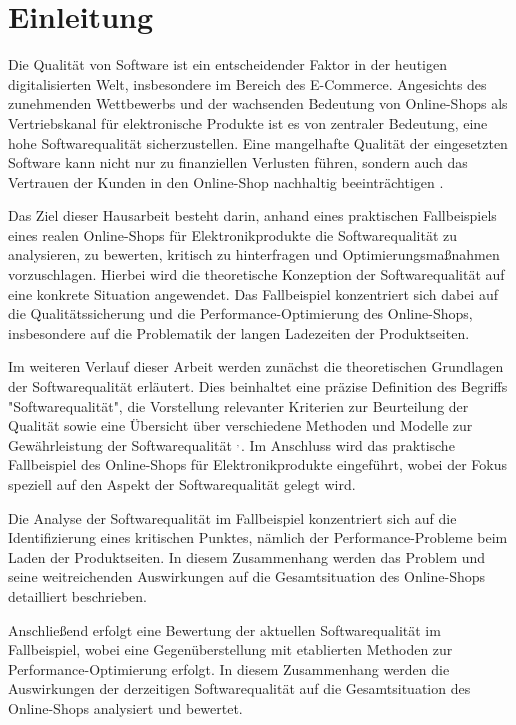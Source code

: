 \section{Einleitung}
Die Qualität von Software ist ein entscheidender Faktor in der heutigen digitalisierten Welt, insbesondere im Bereich des E-Commerce. Angesichts des zunehmenden Wettbewerbs und der wachsenden Bedeutung von Online-Shops als Vertriebskanal für elektronische Produkte ist es von zentraler Bedeutung, eine hohe Softwarequalität sicherzustellen. Eine mangelhafte Qualität der eingesetzten Software kann nicht nur zu finanziellen Verlusten führen, sondern auch das Vertrauen der Kunden in den Online-Shop nachhaltig beeinträchtigen .

Das Ziel dieser Hausarbeit besteht darin, anhand eines praktischen Fallbeispiels eines realen Online-Shops für Elektronikprodukte die Softwarequalität zu analysieren, zu bewerten, kritisch zu hinterfragen und Optimierungsmaßnahmen vorzuschlagen. Hierbei wird die theoretische Konzeption der Softwarequalität auf eine konkrete Situation angewendet. Das Fallbeispiel konzentriert sich dabei auf die Qualitätssicherung und die Performance-Optimierung des Online-Shops, insbesondere auf die Problematik der langen Ladezeiten der Produktseiten.

Im weiteren Verlauf dieser Arbeit werden zunächst die theoretischen Grundlagen der Softwarequalität erläutert. Dies beinhaltet eine präzise Definition des Begriffs "Softwarequalität", die Vorstellung relevanter Kriterien zur Beurteilung der Qualität sowie eine Übersicht über verschiedene Methoden und Modelle zur Gewährleistung der Softwarequalität 
$^{,\hspace{1pt}}$. Im Anschluss wird das praktische Fallbeispiel des Online-Shops für Elektronikprodukte eingeführt, wobei der Fokus speziell auf den Aspekt der Softwarequalität gelegt wird.

Die Analyse der Softwarequalität im Fallbeispiel konzentriert sich auf die Identifizierung eines kritischen Punktes, nämlich der Performance-Probleme beim Laden der Produktseiten. In diesem Zusammenhang werden das Problem und seine weitreichenden Auswirkungen auf die Gesamtsituation des Online-Shops detailliert beschrieben.

Anschließend erfolgt eine Bewertung der aktuellen Softwarequalität im Fallbeispiel, wobei eine Gegenüberstellung mit etablierten Methoden zur Performance-Optimierung erfolgt. In diesem Zusammenhang werden die Auswirkungen der derzeitigen Softwarequalität auf die Gesamtsituation des Online-Shops analysiert und bewertet.

